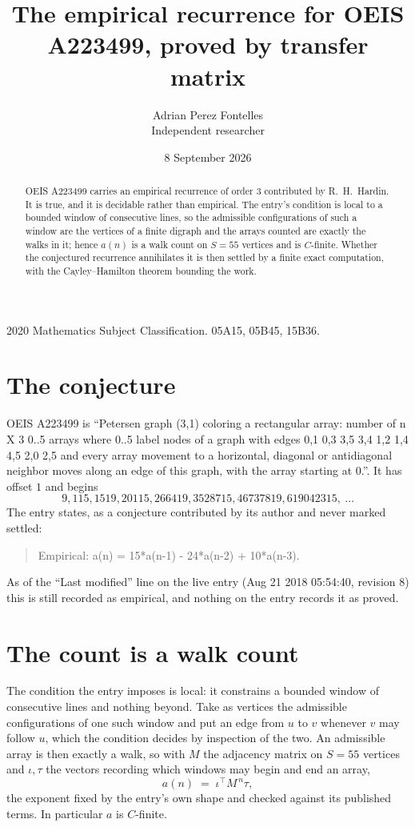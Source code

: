 \documentclass[11pt,a4paper]{article}
\title{The empirical recurrence for OEIS A223499, proved by transfer matrix}
\author{Adrian Perez Fontelles\\ \small Independent researcher}
\date{8 September 2026}
\theoremstyle{plain}
\theoremstyle{definition}
\begin{document}
\maketitle

\begin{abstract}
OEIS A223499 carries an empirical recurrence of order $3$ contributed by R.~H.~Hardin. It is
true, and it is decidable rather than empirical. The entry's condition is local to a bounded window of consecutive lines, so
the admissible configurations of such a window are the vertices of a finite digraph and the
arrays counted are exactly the walks in it; hence $a(n)$ is a walk count on $S=55$ vertices
and is $C$-finite. Whether the conjectured recurrence annihilates it is then settled by a
finite exact computation, with the Cayley--Hamilton theorem bounding the work.
\end{abstract}

\noindent\small 2020 Mathematics Subject Classification. 05A15, 05B45, 15B36.\normalsize

\section{The conjecture}

OEIS A223499 is ``Petersen graph (3,1) coloring a rectangular array: number of n X 3 0..5 arrays where 0..5 label nodes of a graph with edges 0,1 0,3 3,5 3,4 1,2 1,4 4,5 2,0 2,5 and every array movement to a horizontal, diagonal or antidiagonal neighbor moves along an edge of this graph, with the array starting at 0.''. It has offset $1$ and begins
\[
9, 115, 1519, 20115, 266419, 3528715, 46737819, 619042315,\ \dots
\]
The entry states, as a conjecture contributed by its author and never marked settled:
\begin{quote}
Empirical: a(n) = 15*a(n-1) - 24*a(n-2) + 10*a(n-3).
\end{quote}
As of the ``Last modified'' line on the live entry (Aug 21 2018 05:54:40, revision 8) this is still
recorded as empirical, and nothing on the entry records it as proved.

\section{The count is a walk count}

The condition the entry imposes is local: it constrains a bounded window of consecutive lines and nothing beyond. Take as
vertices the admissible configurations of one such window and put an edge from $u$ to $v$
whenever $v$ may follow $u$, which the condition decides by inspection of the two. An
admissible array is then exactly a walk, so with $M$ the adjacency matrix on $S=55$ vertices
and $\iota,\tau$ the vectors recording which windows may begin and end an array,
\[
a(n)\;=\;\iota^{\!\top}M^{\,n}\tau ,
\]
the exponent fixed by the entry's own shape and checked against its published terms. In
particular $a$ is $C$-finite.
\end{document}
